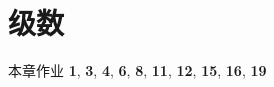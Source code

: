 \part{级数}


\begin{frame}[<*>]{本章作业}
\textbf{1}, \textbf{3}, \textbf{4}, \textbf{6}, \textbf{8}, \textbf{11}, \textbf{12}, \textbf{15}, \textbf{16}, \textbf{19}
\end{frame}
